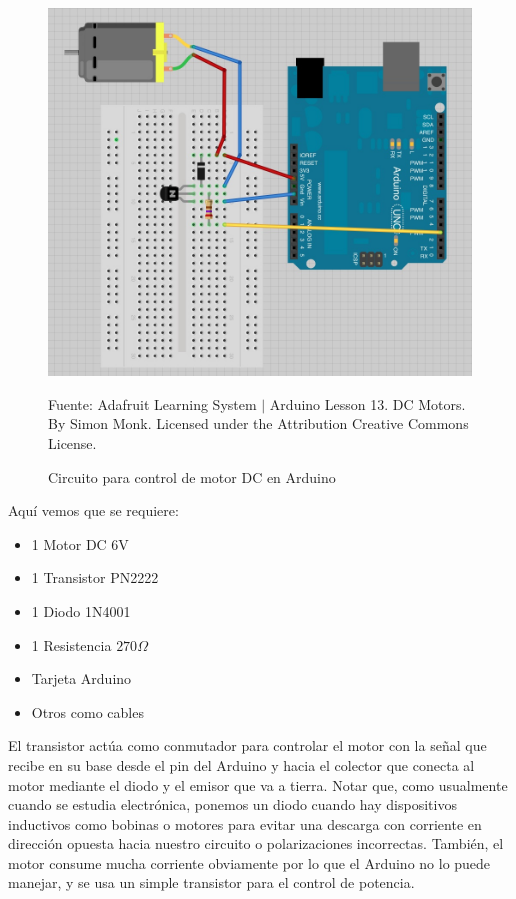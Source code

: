 \documentclass[conference]{IEEEtran}
\begin{document}
\begin{figure}[H]
\centering
\includegraphics[width=0.3\paperwidth]{images/dc-motor-arduino-circuit}
\caption{Circuito para control de motor DC en Arduino}
\footnotesize
Fuente: Adafruit Learning System $\mid$ Arduino Lesson 13. DC Motors. By Simon Monk. Licensed under the Attribution Creative Commons License.
\end{figure}

Aquí vemos que se requiere:

\begin{itemize}
\item 1 Motor DC 6V
\item 1 Transistor PN2222
\item 1 Diodo 1N4001
\item 1 Resistencia $270 \Omega$
\item Tarjeta Arduino
\item Otros como cables
\end{itemize}

\bigbreak

El transistor actúa como conmutador para controlar el motor con la señal que recibe en su base desde el pin del Arduino y hacia el colector que conecta al motor mediante el diodo y el emisor que va a tierra. Notar que, como usualmente cuando se estudia electrónica, ponemos un diodo cuando hay dispositivos inductivos como bobinas o motores para evitar una descarga con corriente en dirección opuesta hacia nuestro circuito o polarizaciones incorrectas. También, el motor consume mucha corriente obviamente por lo que el Arduino no lo puede manejar, y se usa un simple transistor para el control de potencia.
\end{document}
